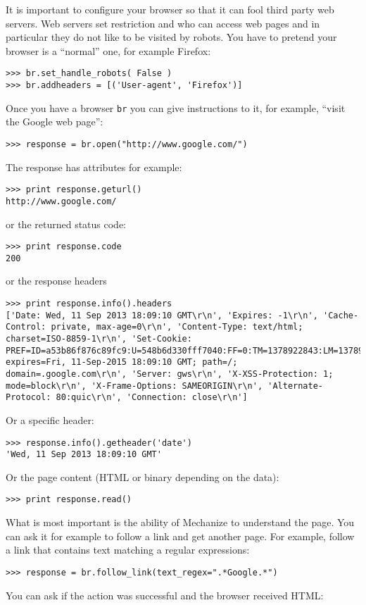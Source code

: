 \documentclass[justified,sixbynine]{tufte-book}
\def\ft{\small\tt}
\theoremstyle{plain}%
\theoremstyle{definition}
\theoremstyle{remark}
\begin{document}
\begin{fullwidth}
It is important to configure your browser so that it can fool third party web servers. Web servers set restriction and who can access web pages and in particular they do not like to be visited by robots. You have to pretend your browser is a ``normal'' one, for example Firefox:
\begin{lstlisting}
>>> br.set_handle_robots( False )
>>> br.addheaders = [('User-agent', 'Firefox')]
\end{lstlisting}
Once you have a browser {\ft br} you can give instructions to it, for example, ``visit the Google web page'':
\begin{lstlisting}
>>> response = br.open("http://www.google.com/")
\end{lstlisting}
The response has attributes for example:
\begin{lstlisting}
>>> print response.geturl()
http://www.google.com/
\end{lstlisting}
or the returned status code:
\begin{lstlisting}
>>> print response.code
200
\end{lstlisting}
or the response headers
\begin{lstlisting}
>>> print response.info().headers
['Date: Wed, 11 Sep 2013 18:09:10 GMT\r\n', 'Expires: -1\r\n', 'Cache-Control: private, max-age=0\r\n', 'Content-Type: text/html; charset=ISO-8859-1\r\n', 'Set-Cookie: PREF=ID=a53b86f876c89fc9:U=548b6d330fff7040:FF=0:TM=1378922843:LM=1378922950:S=xPNYhTPc_HwsBqd8; expires=Fri, 11-Sep-2015 18:09:10 GMT; path=/; domain=.google.com\r\n', 'Server: gws\r\n', 'X-XSS-Protection: 1; mode=block\r\n', 'X-Frame-Options: SAMEORIGIN\r\n', 'Alternate-Protocol: 80:quic\r\n', 'Connection: close\r\n']
\end{lstlisting}
Or a specific header:
\begin{lstlisting}
>>> response.info().getheader('date')
'Wed, 11 Sep 2013 18:09:10 GMT'
\end{lstlisting}
Or the page content (HTML or binary depending on the data):
\begin{lstlisting}
>>> print response.read()
\end{lstlisting}
What is most important is the ability of Mechanize to understand the page. You can ask it for example to follow a link and get another page. For example, follow a link that contains text matching a regular expressions:
\begin{lstlisting}
>>> response = br.follow_link(text_regex=".*Google.*")
\end{lstlisting}
You can ask if the action was successful and the browser received HTML:

\end{fullwidth}
\end{document}
